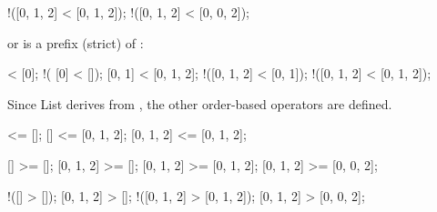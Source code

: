 \begin{urbiscriptapi}
\begin{urbiassert}
!([0, 1, 2] < [0, 1, 2]);
!([0, 1, 2] < [0, 0, 2]);
\end{urbiassert}

  \noindent
  or  is a prefix (strict) of \this:

\begin{urbiassert}
           [] < [0];          !(      [0] < []);
       [0, 1] < [0, 1, 2];    !([0, 1, 2] < [0, 1]);
  !([0, 1, 2] < [0, 1, 2]);
\end{urbiassert}

  Since List derives from , the other order-based
  operators are defined.

\begin{urbiassert}
        [] <= [];
        [] <= [0, 1, 2];
 [0, 1, 2] <= [0, 1, 2];

        [] >= [];
 [0, 1, 2] >= [];
 [0, 1, 2] >= [0, 1, 2];
 [0, 1, 2] >= [0, 0, 2];

       !([] > []);
  [0, 1, 2] > [];
!([0, 1, 2] > [0, 1, 2]);
  [0, 1, 2] > [0, 0, 2];
\end{urbiassert}
\end{urbiscriptapi}

